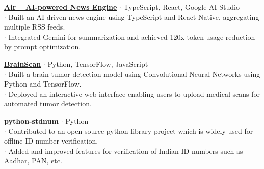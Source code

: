\item{
    \href{https://github.com/1BH23CS024/air}{\textbf{Air -- AI-powered News Engine}} $\cdot$ {TypeScript, React, Google AI Studio} \\
    {$\cdot$ Built an AI-driven news engine using TypeScript and React Native, aggregating multiple RSS feeds.} \\
    {$\cdot$ Integrated Gemini for summarization and achieved 120x token usage reduction by prompt optimization.} \\
}
\item{
    \href{https://github.com/grvchnx/brainscan}{\textbf{BrainScan}} $\cdot$ {Python, TensorFlow, JavaScript} \\
    {$\cdot$ Built a brain tumor detection model using Convolutional Neural Networks using Python and TensorFlow.} \\
    {$\cdot$ Deployed an interactive web interface enabling users to upload medical scans for automated tumor detection.} \\
}
\item{
    \textbf{python-stdnum} $\cdot$ {Python} \\
    {$\cdot$ Contributed to an open-source python library project which is widely used for offline ID number verification.} \\
    {$\cdot$ Added and improved features for verification of Indian ID numbers such as Aadhar, PAN, etc.} \\
}

